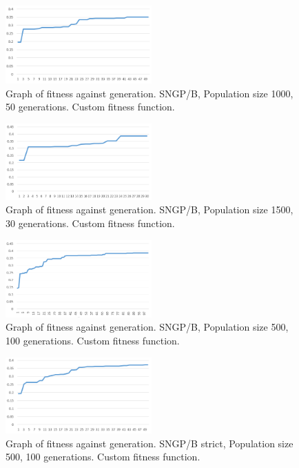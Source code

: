 \documentclass{article}
\begin{document}
    	\begin{figure}[H]
    		\centering
    		\includegraphics[width=0.5\textwidth]{g_sngpb_ff}
    		\caption{Graph of fitness against generation. SNGP/B, Population size 1000, 50 generations. Custom fitness function.}
    		\label{g:sngpb_ff}
    	\end{figure}
    
    	\begin{figure}[H]
    		\centering
    		\includegraphics[width=0.5\textwidth]{g_sngpb_ff_p1500_o30}
    		\caption{Graph of fitness against generation. SNGP/B, Population size 1500, 30 generations. Custom fitness function.}
    		\label{g:sngpb_ff_p1500}
    	\end{figure}
    
    	\begin{figure}[H]
    		\centering
    		\includegraphics[width=0.5\textwidth]{g_sngpb_ff1_p500_o100}
    		\caption{Graph of fitness against generation. SNGP/B, Population size 500, 100 generations. Custom fitness function.}
    		\label{g:sngpb_ff_p500}
    	\end{figure}
    
    	\begin{figure}[H]
    		\centering
    		\includegraphics[width=0.5\textwidth]{g_sngpb_ff_strict}
    		\caption{Graph of fitness against generation. SNGP/B strict, Population size 500, 100 generations. Custom fitness function.}
    		\label{g:sngpb_ff_strict}
    	\end{figure}
        
\end{document}
